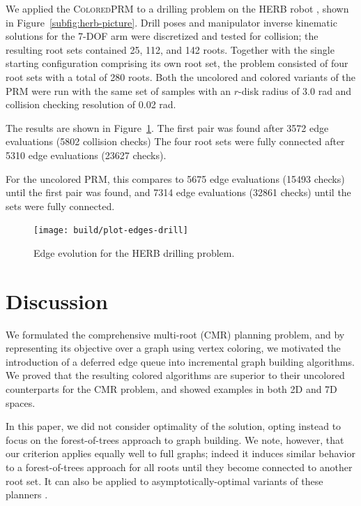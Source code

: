 We applied the \textsc{ColoredPRM} to a drilling problem on the HERB
robot \cite{srinivasa2012herb20}, shown in Figure~\ref{subfig:herb-picture}.
Drill poses and manipulator inverse kinematic solutions for the 7-DOF
arm were discretized and tested for collision;
the resulting root sets contained 25, 112, and 142 roots.
Together with the single starting configuration comprising its own root set,
the problem consisted of four root sets with a total of 280 roots.
Both the uncolored and colored variants of the PRM were run
with the same set of samples with an $r$-disk radius of 3.0 rad
and collision checking resolution of 0.02 rad.

The results are shown in Figure~\ref{fig:herb-drilling}.
The first pair was found after 3572 edge evaluations (5802 collision checks)
The four root sets were fully connected after 5310 edge evaluations
(23627 checks).

For the uncolored PRM,
this compares to 5675 edge evaluations (15493 checks)
until the first pair was found,
and 7314 edge evaluations (32861 checks) until the sets
were fully connected.

\begin{figure}[t]
\centering
\texttt{[image: build/plot-edges-drill]}
\caption{Edge evolution for the HERB drilling problem.}
\label{fig:herb-drilling}
\end{figure}

\section{Discussion}
\label{sec:discussion}

We formulated the comprehensive multi-root (CMR) planning problem,
and by representing its objective over a graph using vertex coloring,
we motivated the introduction of a deferred edge queue into
incremental graph building algorithms.
We proved that the resulting colored algorithms
are superior to their uncolored counterparts for the CMR problem,
and showed examples in both 2D and 7D spaces.

In this paper, we did not consider optimality of the solution,
opting instead to focus on the forest-of-trees approach to graph building.
We note, however, that our criterion applies equally well to full graphs;
indeed it induces similar behavior to a forest-of-trees approach
for all roots until they become connected to another root set.
It can also be applied to  asymptotically-optimal variants of these planners
\cite{karaman2011samplingoptimal}.
